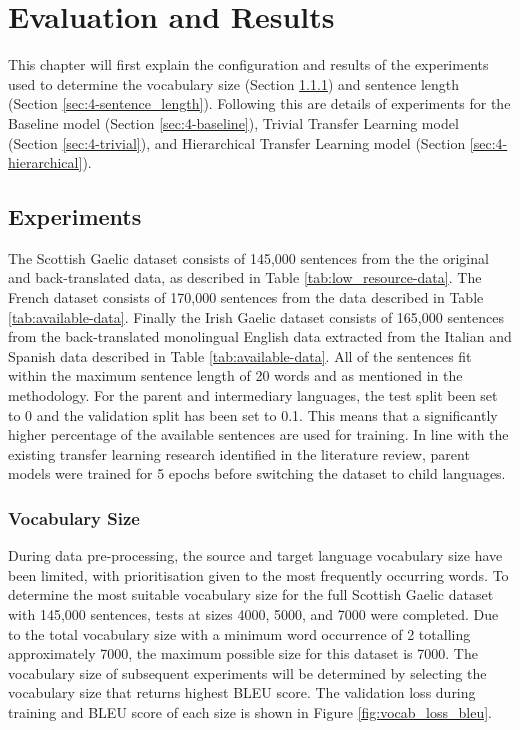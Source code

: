 \chapter{Evaluation and Results}
This chapter will first explain the configuration and results of the experiments used to determine the vocabulary size (Section \ref{sec:4-vocab_size}) and sentence length (Section \ref{sec:4-sentence_length}). Following this are details of experiments for the Baseline model (Section \ref{sec:4-baseline}), Trivial Transfer Learning model (Section \ref{sec:4-trivial}), and Hierarchical Transfer Learning model (Section \ref{sec:4-hierarchical}).
\newpage

\section{Experiments}

The Scottish Gaelic dataset consists of 145,000 sentences from the the original and back-translated data, as described in Table \ref{tab:low_resource-data}. The French dataset consists of 170,000 sentences from the data described in Table \ref{tab:available-data}. Finally the Irish Gaelic dataset consists of 165,000 sentences from the back-translated monolingual English data extracted from the Italian and Spanish data described in Table \ref{tab:available-data}.
All of the sentences fit within the maximum sentence length of 20 words and as mentioned in the methodology.
For the parent and intermediary languages, the test split been set to 0 and the validation split has been set to 0.1. This means that a significantly higher percentage of the available sentences are used for training. In line with the existing transfer learning research identified in the literature review, parent models were trained for 5 epochs before switching the dataset to child languages.


\subsection{Vocabulary Size}
\label{sec:4-vocab_size}

During data pre-processing, the source and target language vocabulary size have been limited, with prioritisation given to the most frequently occurring words. To determine the most suitable vocabulary size for the full Scottish Gaelic dataset with 145,000 sentences, tests at sizes 4000, 5000, and 7000 were completed. Due to the total vocabulary size with a minimum word occurrence of 2 totalling approximately 7000, the maximum possible size for this dataset is 7000. 
The vocabulary size of subsequent experiments will be determined by selecting the vocabulary size that returns highest \acrshort{BLEU} score. The validation loss during training and \acrshort{BLEU} score of each size is shown in Figure \ref{fig:vocab_loss_bleu}.

